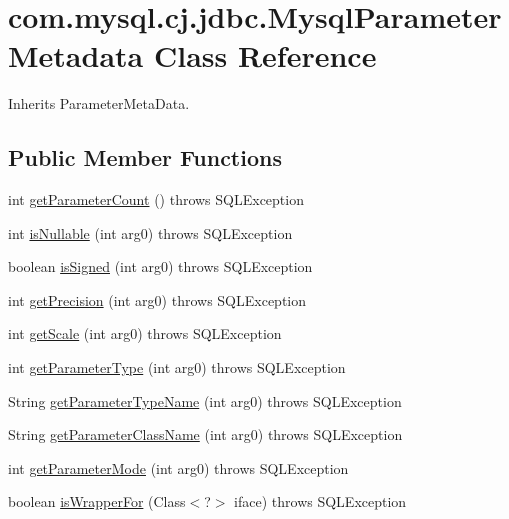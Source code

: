 \hypertarget{classcom_1_1mysql_1_1cj_1_1jdbc_1_1_mysql_parameter_metadata}{}\section{com.\+mysql.\+cj.\+jdbc.\+Mysql\+Parameter\+Metadata Class Reference}
\label{classcom_1_1mysql_1_1cj_1_1jdbc_1_1_mysql_parameter_metadata}


Inherits Parameter\+Meta\+Data.

\subsection*{Public Member Functions}
\begin{DoxyCompactItemize}
\item 
int \mbox{\hyperlink{classcom_1_1mysql_1_1cj_1_1jdbc_1_1_mysql_parameter_metadata_a2fa32005faabf66ca5bb70be1021f16a}{get\+Parameter\+Count}} ()  throws S\+Q\+L\+Exception 
\item 
int \mbox{\hyperlink{classcom_1_1mysql_1_1cj_1_1jdbc_1_1_mysql_parameter_metadata_aa47fbc3b32addcebc2b7c3decb902ae1}{is\+Nullable}} (int arg0)  throws S\+Q\+L\+Exception 
\item 
boolean \mbox{\hyperlink{classcom_1_1mysql_1_1cj_1_1jdbc_1_1_mysql_parameter_metadata_af921abbd27a6f5ea0e0d2fa8a5c9c151}{is\+Signed}} (int arg0)  throws S\+Q\+L\+Exception 
\item 
int \mbox{\hyperlink{classcom_1_1mysql_1_1cj_1_1jdbc_1_1_mysql_parameter_metadata_af2d81c72f7be005a971f83669a8cc237}{get\+Precision}} (int arg0)  throws S\+Q\+L\+Exception 
\item 
int \mbox{\hyperlink{classcom_1_1mysql_1_1cj_1_1jdbc_1_1_mysql_parameter_metadata_a763084a92b67fa528a05dea0c3cf7755}{get\+Scale}} (int arg0)  throws S\+Q\+L\+Exception 
\item 
int \mbox{\hyperlink{classcom_1_1mysql_1_1cj_1_1jdbc_1_1_mysql_parameter_metadata_ad52cd0add986cbe7a5df141620eb25eb}{get\+Parameter\+Type}} (int arg0)  throws S\+Q\+L\+Exception 
\item 
String \mbox{\hyperlink{classcom_1_1mysql_1_1cj_1_1jdbc_1_1_mysql_parameter_metadata_a5c0afbc2c6faa46b8e58fb585038edcd}{get\+Parameter\+Type\+Name}} (int arg0)  throws S\+Q\+L\+Exception 
\item 
String \mbox{\hyperlink{classcom_1_1mysql_1_1cj_1_1jdbc_1_1_mysql_parameter_metadata_aea703d8ae2b53aaf5d19a029c645f12b}{get\+Parameter\+Class\+Name}} (int arg0)  throws S\+Q\+L\+Exception 
\item 
int \mbox{\hyperlink{classcom_1_1mysql_1_1cj_1_1jdbc_1_1_mysql_parameter_metadata_aab903f6923b0d4a9653e01acbbc7d520}{get\+Parameter\+Mode}} (int arg0)  throws S\+Q\+L\+Exception 
\item 
boolean \mbox{\hyperlink{classcom_1_1mysql_1_1cj_1_1jdbc_1_1_mysql_parameter_metadata_a196a5bb16a36dd89fe72d5b46db15b0e}{is\+Wrapper\+For}} (Class$<$?$>$ iface)  throws S\+Q\+L\+Exception 
\end{DoxyCompactItemize}


